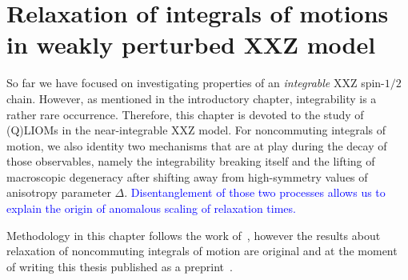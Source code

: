 \chapter{Relaxation of integrals of motions in weakly perturbed XXZ model\label{chap:decay}}
\thispagestyle{chapterBeginStyle}


So far we have focused on investigating properties of an \emph{integrable} XXZ
spin-\(1/2\) chain. However, as mentioned in the introductory chapter,
integrability is a rather rare occurrence. Therefore, this chapter is devoted
to the study of (Q)LIOMs in the near-integrable XXZ model. For noncommuting integrals
of motion, we also identity two mechanisms that are at play during the decay of those
observables, namely the integrability breaking itself and the lifting of macroscopic
degeneracy after shifting away from high-symmetry values of anisotropy parameter \(\Delta\).
\textcolor{blue}{Disentanglement of those two processes allows us to explain the origin of anomalous
scaling of relaxation times.}

Methodology in this chapter follows the work of~\textcite{Mierzejewski2015Approx},
however the results about relaxation of noncommuting integrals
of motion are original and at the moment of writing this thesis published as
a preprint~\autocite{mierzejewski2021multiple}.
